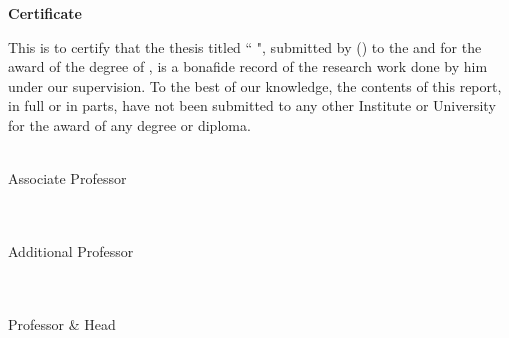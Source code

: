 \setmainfont[ Path = font/,
 BoldFont={CandaraBI}, 
 ItalicFont={booki},
 BoldItalicFont={bookbi}
 ]{bookr}


\begin{flushright}
\huge{\textbf{Certificate}}
\end{flushright}

  This is to certify that the thesis titled `` \emph{\ttitle{}} ", submitted by \authorname{} (\rn{}) to the \iitj{} and \aiimsj{} for the award of the degree of \degree{}, is a bonafide record of the research work done by him under our supervision. To the best of our knowledge, the contents of this report, in full or in parts, have not been submitted to any other Institute or University for the award of any degree or diploma.
\vspace{2cm}

\begin{flushright}
\supname\\
Associate Professor\\
\depsup{}\\
\iitj{}
\end{flushright}
\vspace{1.5cm}

\begin{flushright}
\cosupname\\
Additional Professor\\
\depcosup{}\\
\aiimsj{}
\end{flushright}
\vspace{1.5cm}

\begin{flushright}
\caresupname\\
Professor \& Head \\
\depcaresup{}\\
\aiimsj{}
\end{flushright}
